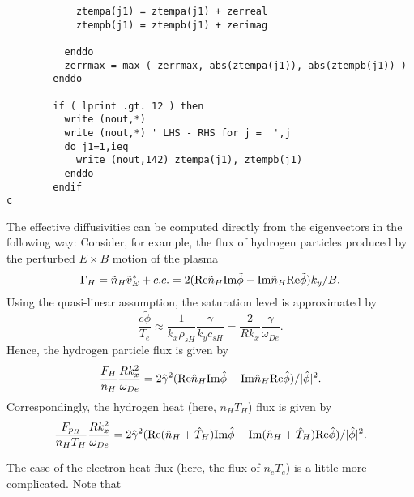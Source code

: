 \begin{verbatim}
            ztempa(j1) = ztempa(j1) + zerreal
            ztempb(j1) = ztempb(j1) + zerimag

          enddo
          zerrmax = max ( zerrmax, abs(ztempa(j1)), abs(ztempb(j1)) )
        enddo

        if ( lprint .gt. 12 ) then
          write (nout,*)
          write (nout,*) ' LHS - RHS for j =  ',j
          do j1=1,ieq
            write (nout,142) ztempa(j1), ztempb(j1)
          enddo
        endif
c
\end{verbatim}

The effective diffusivities can be computed directly from the 
eigenvectors in the following way:
Consider, for example, the flux of hydrogen particles produced by
the perturbed $ E \times B $ motion of the plasma
\[ \Gamma_H = \tilde{n}_H \tilde{v}_E^* + c.c. 
 = 2 ( {\rm Re} \tilde{n}_H {\rm Im} \tilde{\phi}
     - {\rm Im} \tilde{n}_H {\rm Re} \tilde{\phi} ) k_y / B. \]
Using the quasi-linear assumption, the saturation level is 
approximated by
\[ \frac{e \tilde{\phi}}{T_e}
 \approx \frac{1}{k_x \rho_{sH}} \frac{ \gamma }{ k_y c_{sH} }
 = \frac{2}{R k_x} \frac{\gamma}{\omega_{De}}. \]
Hence, the hydrogen particle flux is given by
\[ \frac{ F_H }{ n_H } \frac{ R k_x^2 }{ \omega_{De} }
  = 2 \hat{\gamma}^2
  ( {\rm Re} \hat{n}_H {\rm Im} \hat{\phi}
  - {\rm Im} \hat{n}_H {\rm Re} \hat{\phi} ) / | \hat{\phi} |^2.
   \]
Correspondingly, the hydrogen heat (here, $ n_H T_H $) flux is given by
\[ \frac{ F_{p_H} }{ n_H T_H } \frac{ R k_x^2 }{ \omega_{De} }
  = 2 \hat{\gamma}^2
  ( {\rm Re} ( \hat{n}_H + \hat{T}_H ) {\rm Im} \hat{\phi}
  - {\rm Im} ( \hat{n}_H + \hat{T}_H ) {\rm Re} \hat{\phi} )
    / | \hat{\phi} |^2.
   \]

The case of the electron heat flux (here, the flux of $ n_e T_e $)
is a little more complicated.  Note that

